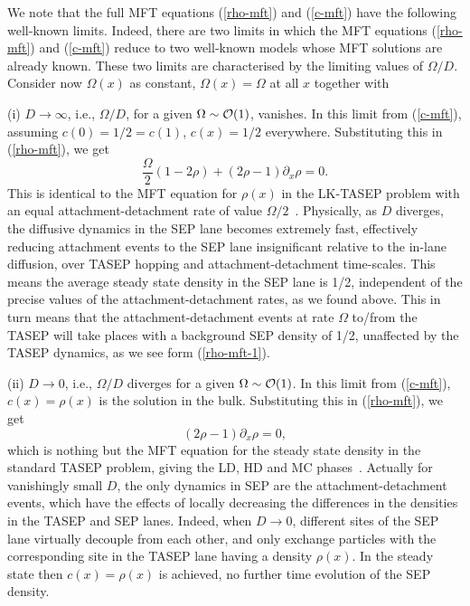 \documentclass[aps,pre,twocolumn,superscriptaddress,amsmath,amssymb,longbibliography,floatfix]{revtex4}
\begin{document}
 

We note that the full MFT equations (\ref{rho-mft}) and (\ref{c-mft}) have the following well-known limits. %
{Indeed, there are two limits in which the MFT equations (\ref{rho-mft}) and 
(\ref{c-mft}) reduce to two well-known models whose MFT solutions are already known.}  These two limits are characterised by the limiting values of  $\Omega/D$.
 Consider now $\Omega(x)$ as constant, $\Omega(x)=\Omega$ at all $x$ together with

(i) $D\rightarrow \infty$, i.e., $\Omega/D$, for a given $\Omega\sim {\cal O}(1)$, vanishes. In this limit from (\ref{c-mft}), assuming $c(0)=1/2=c(1)$, $c(x)=1/2$ everywhere. Substituting this in (\ref{rho-mft}), we get
\begin{equation}
    \frac{\Omega}{2}(1-2\rho)+(2\rho-1)\partial_x\rho =0.\label{rho-mft-1}
\end{equation}
This is identical to the MFT equation for $\rho(x)$ in the LK-TASEP problem with an equal attachment-detachment rate of value $\Omega/2$~\cite{frey-2lane}. Physically, as $D$ diverges, the diffusive dynamics in the SEP lane becomes extremely fast, effectively reducing attachment events to the SEP lane insignificant relative to the in-lane diffusion, over TASEP hopping and attachment-detachment time-scales. This means the average steady state density in the SEP lane is 1/2, independent of the precise values of the attachment-detachment rates, as we found above. This in turn means that the attachment-detachment events at rate $\Omega$ to/from the TASEP will take places with a background SEP density of 1/2, unaffected by the TASEP dynamics, as we see form (\ref{rho-mft-1}).

(ii) $D\rightarrow 0$, i.e., $\Omega/D$ diverges for a given $\Omega\sim {\cal O}(1)$.  In this limit from (\ref{c-mft}), $c(x)=\rho(x)$ is the solution in the bulk. Substituting this in (\ref{rho-mft}), we get
\begin{equation}
 (2\rho-1)\partial_x\rho =0,
\end{equation}
which is nothing but the MFT equation for the steady state density in the standard TASEP problem, giving the LD, HD and MC phases~\cite{blythe}. Actually for vanishingly small $D$, the only dynamics in SEP are the attachment-detachment events, which have the effects of locally decreasing the differences in the densities in the TASEP and SEP lanes. Indeed, when $D\rightarrow 0$, different sites of the SEP lane virtually decouple from each other, and only exchange particles with the corresponding site in the TASEP lane having a density $\rho(x)$. In the steady state then $c(x)=\rho(x)$ is achieved, no further time evolution of the SEP density.
\end{document}

